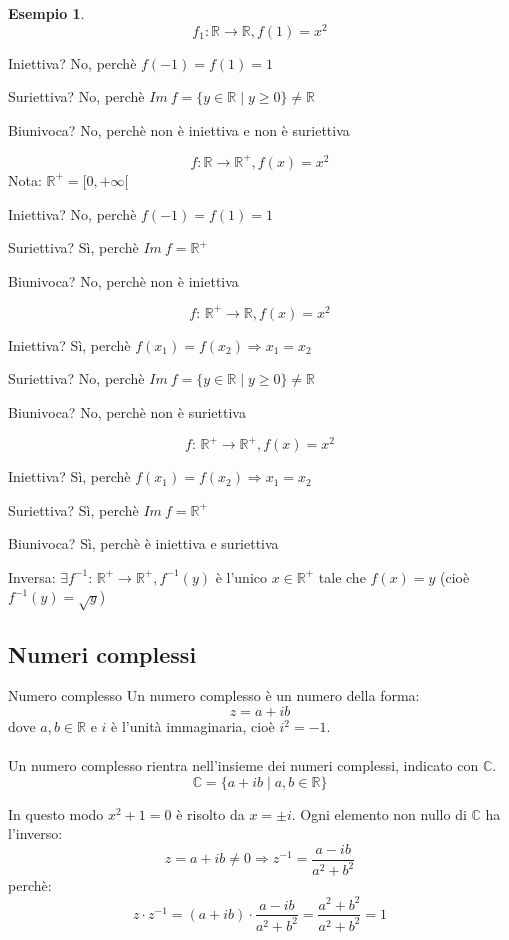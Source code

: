 \documentclass[a4paper]{article}
\theoremstyle{definition}
\newtheorem*{es}{Esempio}
\begin{document}
\begin{es}
	\[ f_1: \mathbb{R} \rightarrow \mathbb{R}, f(1) = x^2 \]
	\begin{description}
		\item Iniettiva? No, perchè $f(-1) = f(1) = 1$
		\item Suriettiva? No, perchè $Im \ f = \{y \in \mathbb{R} \mid y \ge 0\} \ne \mathbb{R}$
		\item Biunivoca? No, perchè non è iniettiva e non è suriettiva
	\end{description}
	\[ f: \mathbb{R} \rightarrow \mathbb{R}^{+}, f(x) = x^2 \]
	Nota: $\mathbb{R}^+ = [0, +\infty[$
	\begin{description}
		\item Iniettiva? No, perchè $f(-1) = f(1) = 1$
		\item Suriettiva? Sì, perchè $Im \ f = \mathbb{R}^+$
		\item Biunivoca? No, perchè non è iniettiva
	\end{description}
	\[ f:\, \mathbb{R}^+ \rightarrow \mathbb{R}, f(x) = x^2 \]
	\begin{description}
		\item Iniettiva? Sì, perchè $f(x_1) = f(x_2) \Rightarrow x_1 = x_2$
		\item Suriettiva? No, perchè $Im \ f = \{y \in \mathbb{R} \mid y \ge 0\} \ne \mathbb{R}$
		\item Biunivoca? No, perchè non è suriettiva
	\end{description}
	\[ f:\, \mathbb{R}^+ \rightarrow \mathbb{R}^+, f(x) = x^2 \]
	\begin{description}
		\item Iniettiva? Sì, perchè $f(x_1) = f(x_2) \Rightarrow x_1 = x_2$
		\item Suriettiva? Sì, perchè $Im \ f = \mathbb{R}^+$
		\item Biunivoca? Sì, perchè è iniettiva e suriettiva
		\item Inversa: $\exists f^{-1}:\, \mathbb{R}^+ \rightarrow \mathbb{R}^+, f^{-1}(y)$ è l'unico $x \in \mathbb{R}^+$ tale che $f(x) = y$ (cioè $f^{-1}(y) = \sqrt{y}$)
	\end{description}
\end{es}

\subsection{Numeri complessi}
\begin{deff}{Numero complesso}{}
	Un numero complesso è un numero della forma:
	\[ z = a + ib \]
	dove $a, b \in \mathbb{R}$ e $i$ è l'unità immaginaria, cioè $i^2 = -1$. \\\\
	Un numero complesso rientra nell'insieme dei numeri complessi, indicato con $\mathbb{C}$.
	\[ \mathbb{C} = \{a + ib \mid a, b \in \mathbb{R}\} \]
\end{deff}
In questo modo $x^2 + 1 = 0$ è risolto da $x = \pm i$.
Ogni elemento non nullo di $\mathbb{C}$ ha l'inverso:
\[ z = a + ib \ne 0 \Rightarrow z^{-1} = \frac{a - ib}{a^2 + b^2} \]
perchè:
\[ z \cdot z^{-1} = (a + ib) \cdot \frac{a - ib}{a^2 + b^2} = \frac{a^2 + b^2}{a^2 + b^2} = 1 \]
\end{document}
